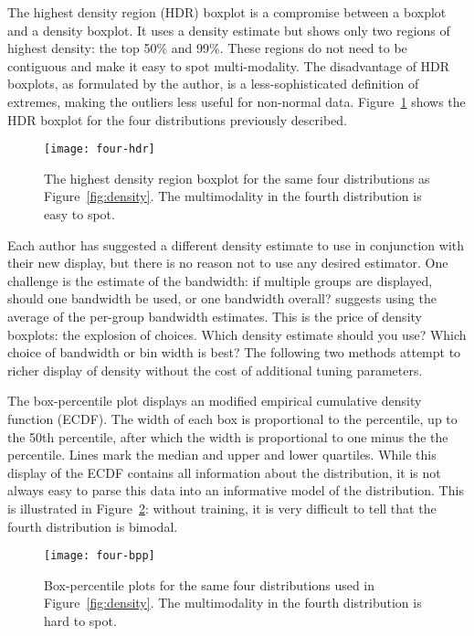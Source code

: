 \documentclass[oneside]{article}
\begin{document}
The highest density region (HDR) boxplot \citep{hyndman:1996a} is a compromise between a boxplot and a density boxplot. It uses a density estimate but shows only two regions of highest density: the top 50\% and 99\%. These regions do not need to be contiguous and make it easy to spot multi-modality.  The disadvantage of HDR boxplots, as formulated by the author, is a less-sophisticated definition of extremes, making the outliers less useful for non-normal data. Figure~\ref{fig:hdr} shows the HDR boxplot for the four distributions previously described.

\begin{figure}[htbp]
  \centering
    \texttt{[image: four-hdr]}%
  \caption{The highest density region boxplot for the same four distributions as Figure~\ref{fig:density}. The multimodality in the fourth distribution is easy to spot.}
  \label{fig:hdr}
\end{figure}

Each author has suggested a different density estimate to use in conjunction with their new display, but there is no reason not to use any desired estimator. One challenge is the estimate of the bandwidth: if multiple groups are displayed, should one bandwidth be used, or one bandwidth overall? \citet{kampstra:2008} suggests using the average of the per-group bandwidth estimates. This is the price of density boxplots: the explosion of choices. Which density estimate should you use? Which choice of bandwidth or bin width is best? The following two methods attempt to richer display of density without the cost of additional tuning parameters.

The box-percentile plot \citep{esty:2003} displays an modified empirical cumulative density function (ECDF). The width of each box is proportional to the percentile, up to the 50th percentile, after which the width is proportional to one minus the the percentile. Lines mark the median and upper and lower quartiles. While this display of the ECDF contains all information about the distribution, it is not always easy to parse this data into an informative model of the distribution. This is illustrated in Figure~\ref{fig:bpp}: without training, it is very difficult to tell that the fourth distribution is bimodal.

\begin{figure}[htbp]
  \centering
  \texttt{[image: four-bpp]}
  \caption{Box-percentile plots for the same four distributions used in Figure~\ref{fig:density}. The multimodality in the fourth distribution is hard to spot.}
  \label{fig:bpp}
\end{figure}
\end{document}
